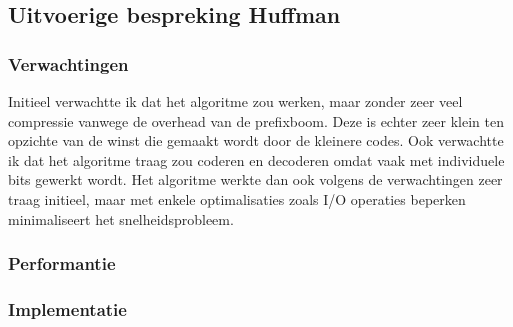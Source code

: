 \documentclass[11pt, a4paper]{article}
\begin{document}
\subsection{Uitvoerige bespreking Huffman}
\subsubsection{Verwachtingen}
Initieel verwachtte ik dat het algoritme zou werken, maar zonder zeer veel compressie vanwege de overhead van de prefixboom. Deze is echter zeer klein ten opzichte van de winst die gemaakt wordt door de kleinere codes. Ook verwachtte ik dat het algoritme traag zou coderen en decoderen omdat vaak met individuele bits gewerkt wordt. Het algoritme werkte dan ook volgens de verwachtingen zeer traag initieel, maar met enkele optimalisaties zoals I/O operaties beperken minimaliseert het snelheidsprobleem. 

\subsubsection{Performantie}
\subsubsection{Implementatie}
\end{document}
